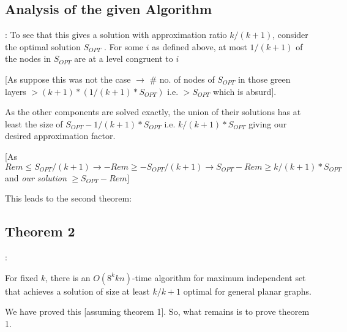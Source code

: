 \documentclass{beamer}
\begin{document}
\subsection{Analysis of the given Algorithm}
\begin{frame}{\secname : \subsecname}
    To see that this gives a solution with approximation ratio
$k/(k + 1)$, consider the optimal solution $S_{OPT}$ . For some $i$
as defined above, at most $1/(k + 1)$ of the nodes in $S_{OPT}$
are at a level congruent to $i$ 

[As suppose this was not the case $\rightarrow$ \# no. of nodes of $S_{OPT}$ in those green layers $> (k + 1) * (1/(k + 1) * S_{OPT})$ i.e. $ > S_{OPT}$ which is absurd]. 

As the other components
are solved exactly, the union of their solutions has at least
the size of $S_{OPT} - 1/(k + 1) * S_{OPT}$ i.e. $k/(k + 1) * S_{OPT}$ giving our desired approximation factor. 

[As $Rem \leq S_{OPT}/(k + 1) \rightarrow -Rem \geq -S_{OPT}/(k + 1) \rightarrow S_{OPT} - Rem \geq k/(k+1)*S_{OPT}$ and \textit{our solution} $\geq S_{OPT} - Rem$]

This leads to the second theorem:
\end{frame}
\subsection{Theorem 2}
\begin{frame}{\secname : \subsecname}
    \begin{theorem}
        [Baker, 1994] For fixed $k$, there is an
$O(8^kkn)$-time algorithm for maximum independent set
that achieves a solution of size at least $k/k+1$ optimal for
general planar graphs. 
    \end{theorem}

    We have proved this [assuming theorem 1]. So, what remains is to prove theorem 1.
\end{frame}
\end{document}
